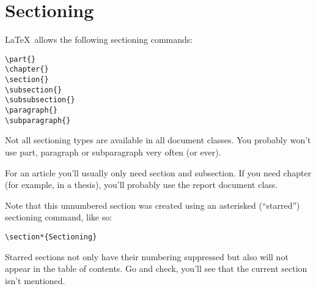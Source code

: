 \section*{Sectioning}

\LaTeX\ allows the following sectioning commands:

\begin{verbatim}
\part{}
\chapter{}
\section{}
\subsection{}
\subsubsection{}
\paragraph{}
\subparagraph{}
\end{verbatim}

Not all sectioning types are available in all document classes.
You probably won't use part, paragraph or subparagraph very often (or ever).

For an article you'll usually only need section and subsection.
If you need chapter (for example, in a thesis), you'll probably use
the report document class.

Note that this unnumbered section was created using an asterisked (``starred'')
sectioning command, like so:

\begin{verbatim}
\section*{Sectioning}
\end{verbatim}

Starred sections not only have their numbering suppressed but also will not
appear in the table of contents.
Go and check, you'll see that the current section isn't mentioned.
